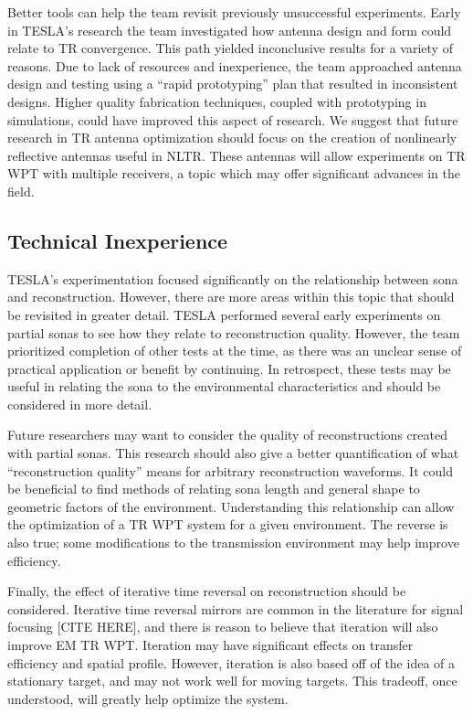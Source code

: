 Better tools can help the team revisit previously unsuccessful experiments. Early in TESLA’s research the team investigated how antenna design and form could relate to TR convergence.  This path yielded inconclusive results for a variety of reasons. Due to lack of resources and inexperience, the team approached antenna design and testing using a “rapid prototyping” plan that resulted in inconsistent designs. Higher quality fabrication techniques, coupled with prototyping in simulations, could have improved this aspect of research.  We suggest that future research in TR antenna optimization should focus on the creation of nonlinearly reflective antennas useful in NLTR.  These antennas will allow experiments on TR WPT with multiple receivers, a topic which may offer significant advances in the field.

\subsection{Technical Inexperience}

TESLA’s experimentation focused significantly on the relationship between sona and reconstruction.  However, there are more areas within this topic that should be revisited in greater detail.  TESLA performed several early experiments on partial sonas to see how they relate to reconstruction quality.  However, the team prioritized completion of other tests at the time, as there was an unclear sense of practical application or benefit by continuing.  In retrospect, these tests may be useful in relating the sona to the environmental characteristics and should be considered in more detail.

Future researchers may want to consider the quality of reconstructions created with partial sonas.  This research should also give a better quantification of what “reconstruction quality” means for arbitrary reconstruction waveforms. It could be beneficial to find methods of relating sona length and general shape to geometric factors of the environment. Understanding this relationship can allow the optimization of a TR WPT system for a given environment. The reverse is also true; some modifications to the transmission environment may help improve efficiency.

Finally, the effect of iterative time reversal on reconstruction should be considered.  Iterative time reversal mirrors are common in the literature for signal focusing [CITE HERE], and there is reason to believe that iteration will also improve EM TR WPT.  Iteration may have significant effects on transfer efficiency and spatial profile.  However, iteration is also based off of the idea of a stationary target, and may not work well for moving targets.  This tradeoff, once understood, will greatly help optimize the system.

